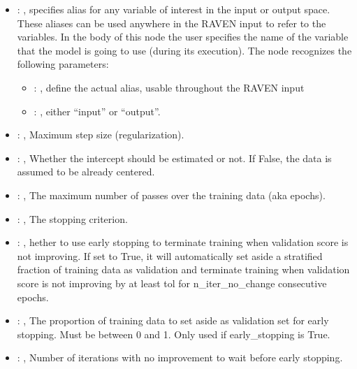 \begin{itemize}
    \item {}: , 
      specifies alias for         any variable of interest in the input or output space. These
      aliases can be used anywhere in the RAVEN input to         refer to the variables. In the body
      of this node the user specifies the name of the variable that the model is going to use
      (during its execution).
      The  node recognizes the following parameters:
        \begin{itemize}
          \item {}: , 
            define the actual alias, usable throughout the RAVEN input
          \item {}: , 
            either ``input'' or ``output''.
      \end{itemize}

    \item {}: , 
      Maximum step size (regularization).

    \item {}: , 
      Whether the intercept should be estimated or not. If False,
      the data is assumed to be already centered.

    \item {}: , 
      The maximum number of passes over the training data (aka epochs).

    \item {}: , 
      The stopping criterion.

    \item {}: , 
      hether to use early stopping to terminate training when validation score is not
      improving. If set to True, it will automatically set aside a stratified fraction of training
      data as validation and terminate training when validation score is not improving by at least
      tol for n\_iter\_no\_change consecutive epochs.

    \item {}: , 
      The proportion of training data to set aside as validation set for early stopping.
      Must be between 0 and 1. Only used if early\_stopping is True.

    \item {}: , 
      Number of iterations with no improvement to wait before early stopping.


\end{itemize}
